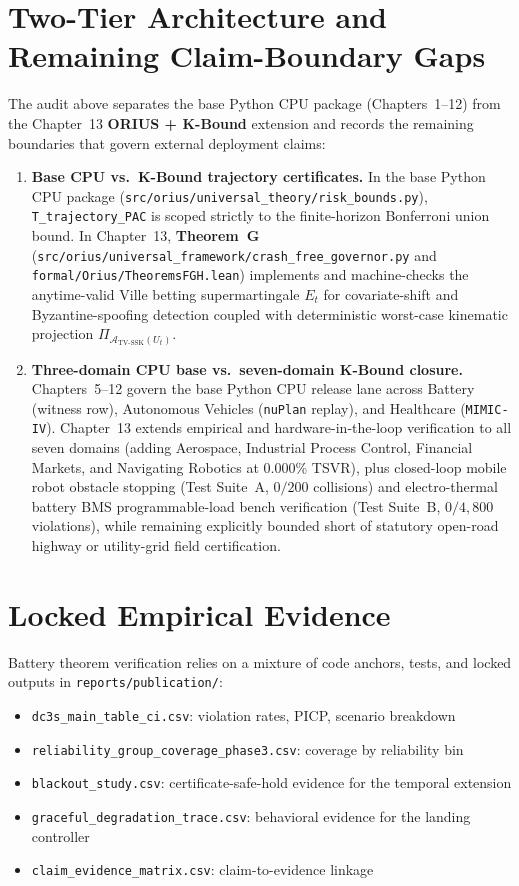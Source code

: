 \section{Two-Tier Architecture and Remaining Claim-Boundary Gaps}

The audit above separates the base Python CPU package (Chapters~1--12) from the
Chapter~13 \textbf{ORIUS + K-Bound} extension and records the remaining boundaries
that govern external deployment claims:
\begin{enumerate}
  \item \textbf{Base CPU vs.\ K-Bound trajectory certificates.} In the base Python CPU
    package (\texttt{src/orius/universal\_theory/risk\_bounds.py}), \texttt{T\_trajectory\_PAC}
    is scoped strictly to the finite-horizon Bonferroni union bound. In Chapter~13,
    \textbf{Theorem~G} (\texttt{src/orius/universal\_framework/crash\_free\_governor.py} and
    \texttt{formal/Orius/TheoremsFGH.lean}) implements and machine-checks the anytime-valid
    Ville betting supermartingale $E_t$ for covariate-shift and Byzantine-spoofing detection
    coupled with deterministic worst-case kinematic projection $\Pi_{\mathcal{A}_{\text{TV-SSK}}(U_t)}$.
  \item \textbf{Three-domain CPU base vs.\ seven-domain K-Bound closure.} Chapters~5--12
    govern the base Python CPU release lane across Battery (witness row), Autonomous Vehicles
    (\texttt{nuPlan} replay), and Healthcare (\texttt{MIMIC-IV}). Chapter~13 extends empirical
    and hardware-in-the-loop verification to all seven domains (adding Aerospace, Industrial
    Process Control, Financial Markets, and Navigating Robotics at 0.000\% TSVR), plus closed-loop
    mobile robot obstacle stopping (Test Suite~A, $0/200$ collisions) and electro-thermal battery
    BMS programmable-load bench verification (Test Suite~B, $0/4{,}800$ violations), while
    remaining explicitly bounded short of statutory open-road highway or utility-grid field
    certification.
\end{enumerate}

\section{Locked Empirical Evidence}

Battery theorem verification relies on a mixture of code anchors, tests, and
locked outputs in \texttt{reports/publication/}:
\begin{itemize}
\item \texttt{dc3s\_main\_table\_ci.csv}: violation rates, PICP, scenario breakdown
\item \texttt{reliability\_group\_coverage\_phase3.csv}: coverage by reliability bin
\item \texttt{blackout\_study.csv}: certificate-safe-hold evidence for the temporal extension
\item \texttt{graceful\_degradation\_trace.csv}: behavioral evidence for the landing controller
\item \texttt{claim\_evidence\_matrix.csv}: claim-to-evidence linkage
\end{itemize}

